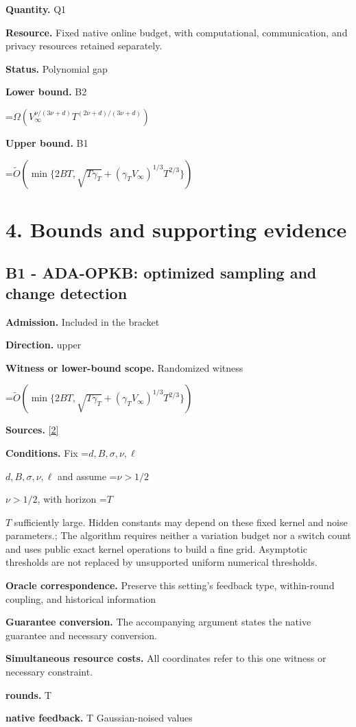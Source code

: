 \documentclass[10pt,a4paper]{article}
\newcommand{\AtlasMath}[1]{\par\begingroup\centering\setbox0=\hbox{$\displaystyle #1$}\ifdim\wd0>1.4\linewidth\typeout{ATLAS WIDE FORMULA: \the\wd0}\fi\ifdim\wd0>\linewidth\resizebox{\linewidth}{!}{\box0}\else\box0\fi\par\endgroup}
\newcommand{\AtlasInlineMath}[1]{\begingroup\setbox0=\hbox{$#1$}\ifdim\wd0>.4\linewidth\endgroup\AtlasMath{#1}\else\endgroup$#1$\fi}
\begin{document}
\textbf{Quantity.} Q1

\textbf{Resource.} Fixed native online budget, with computational, communication, and privacy resources retained separately.

\textbf{Status.} Polynomial gap

\textbf{Lower bound.} B2

\AtlasMath{\Omega(V_\infty^{\nu/(3\nu+d)}T^{(2\nu+d)/(3\nu+d)})}
\textbf{Upper bound.} B1

\AtlasMath{\widetilde{O}\!\left(\min\{2BT,\sqrt{T\gamma_T}+(\gamma_T V_\infty)^{1/3}T^{2/3}\}\right)}
\section{4. Bounds and supporting evidence}
\subsection{B1 - ADA-OPKB: optimized sampling and change detection}
\textbf{Admission.} Included in the bracket

\textbf{Direction.} upper

\textbf{Witness or lower-bound scope.} Randomized witness

\AtlasMath{\widetilde{O}\!\left(\min\{2BT,\sqrt{T\gamma_T}+(\gamma_T V_\infty)^{1/3}T^{2/3}\}\right)}
\textbf{Sources.} \href{https://proceedings.mlr.press/v206/hong23b.html}{[2]}

\textbf{Conditions.} Fix \AtlasInlineMath{d,B,\sigma,\nu,\ell} and assume \AtlasInlineMath{\nu>1/2}, with horizon \AtlasInlineMath{T} sufficiently large. Hidden constants may depend on these fixed kernel and noise parameters.; The algorithm requires neither a variation budget nor a switch count and uses public exact kernel operations to build a fine grid. Asymptotic thresholds are not replaced by unsupported uniform numerical thresholds.

\textbf{Oracle correspondence.} Preserve this setting's feedback type, within-round coupling, and historical information

\textbf{Guarantee conversion.} The accompanying argument states the native guarantee and necessary conversion.

\textbf{Simultaneous resource costs.} All coordinates refer to this one witness or necessary constraint.

\textbf{rounds.} T

\textbf{native feedback.} T Gaussian-noised values
\end{document}
